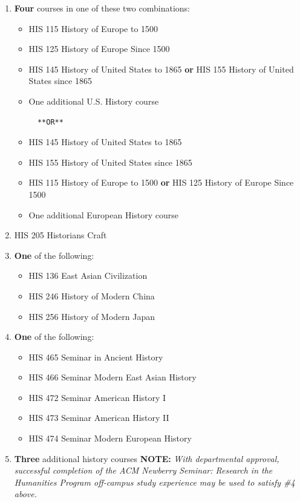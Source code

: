 \documentclass[
  letterpaper,
]{scrbook}
\providecommand{\tightlist}{%
  \setlength{\itemsep}{0pt}\setlength{\parskip}{0pt}}
\begin{document}
\begin{enumerate}
\def\labelenumi{\arabic{enumi}.}
\tightlist
\item
  \textbf{Four} courses in one of these two combinations:

  \begin{itemize}
  \item
    HIS 115 History of Europe to 1500
  \item
    HIS 125 History of Europe Since 1500
  \item
    HIS 145 History of United States to 1865 \textbf{or} HIS 155 History
    of United States since 1865
  \item
    One additional U.S. History course

\begin{verbatim}
  **OR**
\end{verbatim}
  \item
    HIS 145 History of United States to 1865
  \item
    HIS 155 History of United States since 1865
  \item
    HIS 115 History of Europe to 1500 \textbf{or} HIS 125 History of
    Europe Since 1500
  \item
    One additional European History course
  \end{itemize}
\item
  HIS 205 Historians Craft
\item
  \textbf{One} of the following:

  \begin{itemize}
  \tightlist
  \item
    HIS 136 East Asian Civilization
  \item
    HIS 246 History of Modern China
  \item
    HIS 256 History of Modern Japan
  \end{itemize}
\item
  \textbf{One} of the following:

  \begin{itemize}
  \tightlist
  \item
    HIS 465 Seminar in Ancient History
  \item
    HIS 466 Seminar Modern East Asian History
  \item
    HIS 472 Seminar American History I
  \item
    HIS 473 Seminar American History II
  \item
    HIS 474 Seminar Modern European History
  \end{itemize}
\item
  \textbf{Three} additional history courses \textbf{NOTE:} \emph{With
  departmental approval, successful completion of the ACM Newberry
  Seminar: Research in the Humanities Program off-campus study
  experience may be used to satisfy \#4 above.}
\end{enumerate}
\end{document}
